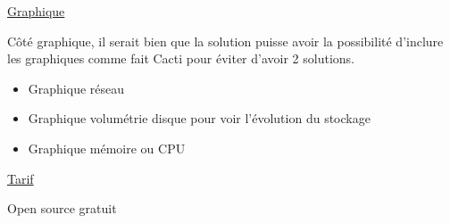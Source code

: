 \ul{Graphique}

Côté graphique, il serait bien que la solution puisse avoir la
possibilité d'inclure les graphiques comme fait Cacti pour éviter
d'avoir 2 solutions.

\begin{itemize}
\item
  Graphique réseau
\item
  Graphique volumétrie disque pour voir l'évolution du stockage
\item
  Graphique mémoire ou CPU
\end{itemize}

\ul{Tarif}

Open source gratuit











